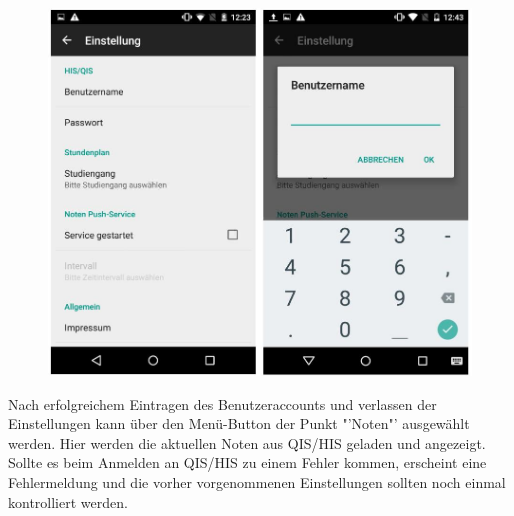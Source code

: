 \begin{figure}[h]
	\centering
	\includegraphics[scale=0.5]{03_Bedienungsanleitung/img/einstellungen.jpg}
\end{figure}




\newpage

Nach erfolgreichem Eintragen des Benutzeraccounts und verlassen der Einstellungen kann über den Menü-Button der Punkt "'Noten"' ausgewählt werden. Hier werden die aktuellen Noten aus QIS/HIS geladen und angezeigt. Sollte es beim Anmelden an QIS/HIS zu einem Fehler kommen, erscheint eine Fehlermeldung und die vorher vorgenommenen Einstellungen sollten noch einmal kontrolliert werden. 

